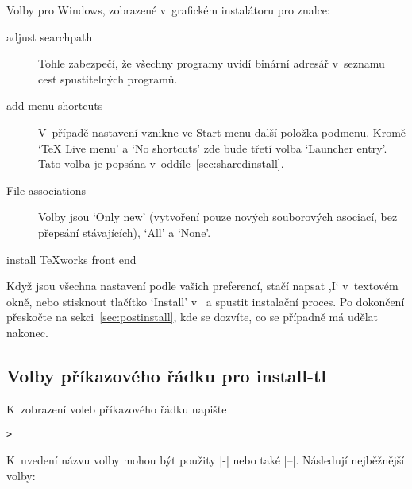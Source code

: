 \documentclass[\classoptions,slovak,english,czech]{\classname}
\newcommand{\singleuv}[1]{,#1`}
\begin{document}
Volby pro Windows, zobrazené v~grafickém instalátoru \GUI{} pro 
znalce:
\begin{description}
\item[adjust searchpath] 
Tohle zabezpečí, že všechny programy uvidí binární adresář 
\TL{} v~seznamu cest spustitelných programů.

\item[add menu shortcuts] V~případě nastavení vznikne ve Start menu
další položka \TL{} podmenu. Kromě `TeX Live menu' a `No shortcuts' 
zde bude třetí volba `Launcher entry'. Tato volba je popsána
v~oddíle~\ref{sec:sharedinstall}.

\item[File associations] Volby jsou `Only new' (vytvoření 
pouze nových souborových asociací, bez přepsání stávajících), `All' a `None'.

\item[install \TeX{}works front end]
\end{description}
Když jsou všechna nastavení podle vašich preferencí, stačí napsat
\singleuv{I} v~textovém okně, nebo stisknout tlačítko `Install' 
v~\GUI{} a spustit instalační proces. Po dokončení přeskočte na
sekci~\ref{sec:postinstall}, kde se dozvíte, co se případně
má udělat nakonec. 

\subsection{Volby příkazového řádku pro install-tl}
\label{sec:cmdline}

K~zobrazení voleb příkazového řádku napište
\begin{alltt}
> 
\end{alltt}
K~uvedení názvu volby mohou být použity |-| nebo také |--|.
Následují nejběžnější volby:
\end{document}
